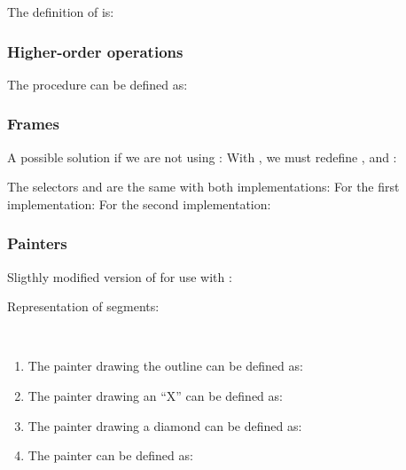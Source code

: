 \begin{exe}[2.44]
    The definition of  is:
\end{exe}

\subsubsection{Higher-order operations}

\begin{exe}[2.45]
    The  procedure can be defined as:
\end{exe}

\subsubsection{Frames}

\begin{exe}[2.46]
    \label{2.46}
    A possible solution if we are not using :
    With , we must redefine ,  
    and :
\end{exe}

\begin{exe}[2.47]
    The selectors  and  are the same with 
    both implementations:
    For the first implementation:
    For the second implementation:
\end{exe}

\subsubsection{Painters}

\begin{comp}
    Sligthly modified version of  for use with 
    :
\end{comp}

\begin{exe}[2.48]
    Representation of segments:
\end{exe}

\begin{exe}[2.49]
    \ \vspace{-20pt}
    \begin{enumerate}
        \item The painter drawing the outline can be defined as: 
        \item The painter drawing an “X” can be defined as: 
        \item The painter drawing a diamond can be defined as: 
        \item The  painter can be defined as: 
    \end{enumerate}
\end{exe}


